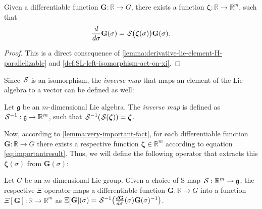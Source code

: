 \begin{lemma} \label{lemma:very-important-fact}
    Given a differentiable function $\mathbf{\mathbf{G}}:\mathbb{R}\to G$, there exists a function $\boldsymbol{\zeta}:\mathbb{R}\to\mathbb{R}^m$, such that
    \begin{align}
    \label{eq:importantresult}
    \frac{d}{d\sigma} \mathbf{\mathbf{G}}(\sigma)=\SL\bigl(\boldsymbol{\zeta}(\sigma)\bigr)\mathbf{\mathbf{G}}(\sigma). 
\end{align}

\end{lemma}
\begin{proof} This is a direct consequence of \cref{lemma:derivative-lie-element-H-parallelizable} and \cref{def:SL-left-isomorphism-act-on-xi}. 
\end{proof}

Since $\SL$ is an isomorphism, the \emph{inverse map} that maps an element of the Lie algebra to a vector can be defined as well:
\begin{definition}\label{def:inverse-isomorphism-SLinv}
    Let $\mathfrak{g}$ be an $m$-dimensional Lie algebra. The \emph{inverse map} is defined as $\invSL:\mathfrak{g}\to\mathbb{R}^m$, such that $\invSL[\SL[\boldsymbol{\zeta}]] = \boldsymbol{\zeta}$. 
\end{definition}

Now, according to \cref{lemma:very-important-fact}, for each differentiable function $\mathbf{G}: \mathbb{R} \to G$ there exists a respective function $\boldsymbol{\zeta} \in \mathbb{R}^m$ according to equation \eqref{eq:importantresult}. Thus, we will define the following operator that extracts this $\boldsymbol{\zeta}(\sigma)$ from $\mathbf{G}(\sigma)$:
\begin{definition} [$\Xi$ operator] \label{def:Xioperator} Let $G$ be an $m$-dimensional Lie group. Given a choice of S map $\SL: \mathbb{R}^m \to \mathfrak{g}$, the respective $\Xi$ operator maps a differentiable function $\mathbf{G}: \mathbb{R} \to G$ into a function $\Xi[\mathbf{G}]: \mathbb{R} \to \mathbb{R}^m$ as $\Xi[\mathbf{G}](\sigma) = \SL^{-1}\bigl(\frac{d\mathbf{G}}{d\sigma}(\sigma)\mathbf{G}(\sigma)^{-1}\bigr)$. 
\end{definition}


